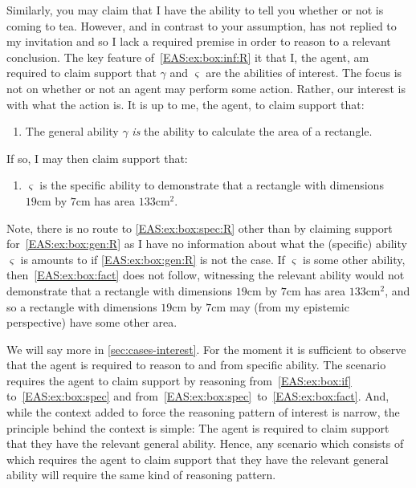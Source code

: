 \begin{note}
{    Similarly, you may claim that I have the ability to tell you whether or not  is coming to tea.
    However, and in contrast to your assumption,  has not replied to my invitation and so I lack a required premise in order to reason to a relevant conclusion.
  }
  The key feature of~\ref{EAS:ex:box:inf:R} it that I, the agent, am required to claim support that \(\gamma\) and \(\varsigma\) are the abilities of interest.
  The focus is not on whether or not an agent may perform some action.
  Rather, our interest is with what the action is.
  It is up to me, the agent, to claim support that:
  \begin{enumerate}[label=\emph{A}\arabic*., ref=(\emph{A}\arabic*), resume*=EAS_counter]
  \item\label{EAS:ex:box:gen:R} The general ability \(\gamma\) \emph{is} the ability to calculate the area of a rectangle.
  \end{enumerate}
  If so, I may then claim support that:
  \begin{enumerate}[label=\emph{A}\arabic*., ref=(\emph{A}\arabic*), resume*=EAS_counter]
  \item\label{EAS:ex:box:spec:R} \(\varsigma\) is the specific ability to demonstrate that a rectangle with dimensions \(19\text{cm}\) by \(7\text{cm}\) has area \(133\text{cm}^{2}\).
  \end{enumerate}
  Note, there is no route to \ref{EAS:ex:box:spec:R} other than by claiming support for~\ref{EAS:ex:box:gen:R} as I have no information about what the (specific) ability \(\varsigma\) is amounts to if \ref{EAS:ex:box:gen:R} is not the case.
  If \(\varsigma\) is some other ability, then~\ref{EAS:ex:box:fact} does not follow, witnessing the relevant ability would not demonstrate that a rectangle with
  dimensions \(19\text{cm}\) by \(7\text{cm}\) has area \(133\text{cm}^{2}\), and so a rectangle with dimensions \(19\text{cm}\) by \(7\text{cm}\) may (from my epistemic perspective) have some other area.
\end{note}

\begin{note}[Point]
  We will say more in \autoref{sec:cases-interest}.
  For the moment it is sufficient to observe that the agent is required to reason to and from specific ability.
  The scenario requires the agent to claim support by reasoning from~\ref{EAS:ex:box:if} to~\ref{EAS:ex:box:spec} and from~\ref{EAS:ex:box:spec}~to~\ref{EAS:ex:box:fact}.
  And, while the context added to force the reasoning pattern of interest is narrow, the principle behind the context is simple:
  The agent is required to claim support that they have the relevant general ability.
  Hence, any scenario which consists of  which requires the agent to claim support that they have the relevant general ability will require the same kind of reasoning pattern.
\end{note}

